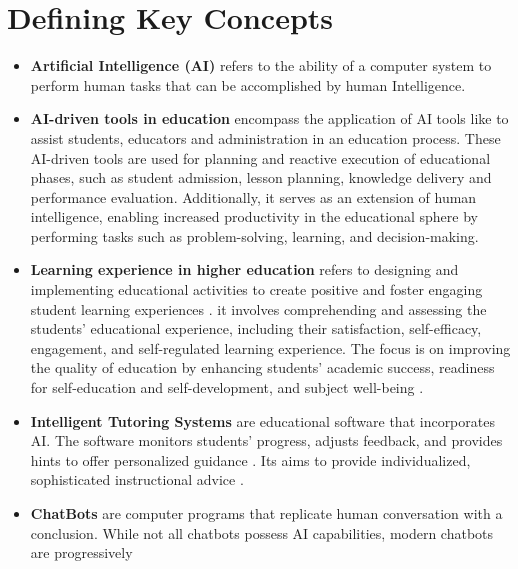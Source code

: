 \section{Defining Key Concepts}\label{sec:defining-key-concepts}
\begin{itemize}
	\item \textbf{Artificial Intelligence (AI)}\label{AI} refers to the ability of a computer system to perform human
	      tasks that can be accomplished by human Intelligence\citep{sadiku_ai_2021}.
	\item \textbf{AI-driven tools in education} encompass the application of AI tools like  to assist
	      students, educators and administration in an education process.
	      These AI-driven tools are used for planning and reactive execution of educational phases, such as
	      student admission, lesson planning, knowledge delivery and performance evaluation\citep{mallik_proactive_2023}.
	      Additionally, it serves as an extension of human intelligence, enabling
	      increased productivity in the educational sphere by performing tasks
	      such as problem-solving, learning, and decision-making\citep{cheng_widespread_2023}.
	\item \textbf{Learning experience in higher education}  refers to designing and implementing educational activities to create
	      positive and foster engaging student learning experiences \citep{kang_supporting_2023}.
	      it involves comprehending and assessing the students’ educational experience, including
	      their satisfaction, self-efficacy, engagement, and self-regulated learning experience\citep{lyz_students_2022}.
	      The focus is on improving the quality of education by enhancing students’ academic success,
	      readiness for self-education and self-development, and subject well-being \citep{iordache-platis_building_2018}.
	\item \textbf{Intelligent Tutoring Systems}
	      are educational software that incorporates AI. The software monitors students'
	      progress, adjusts feedback, and provides hints to offer personalized
	      guidance \citep{shute_intelligent_2010}. Its aims to provide individualized, sophisticated instructional advice
	      \citep{sedlmeier_intelligent_2001}.
	\item \textbf{ ChatBots }\label{chatbot} are computer programs that replicate human conversation with a conclusion.
	      While not all chatbots possess AI capabilities, modern chatbots are progressively

\end{itemize}
